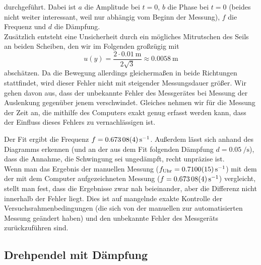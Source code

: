 \documentclass[
	a4paper,
	12pt,
	pagesize,
	ngerman
]{scrartcl}
\begin{document}
	durchgeführt. Dabei ist $a$ die Amplitude bei $t=0$, $b$ die Phase bei $t=0$  (beides nicht weiter interessant, weil nur abhängig vom Beginn der Messung), $f$ die Frequenz und $d$ die Dämpfung.\\
	Zusätzlich entsteht eine Unsicherheit durch ein mögliches Mitrutschen des Seils an beiden Scheiben, den wir im Folgenden großzügig mit 
	\begin{equation*}
		u(y) = \frac{2 \cdot \SI{0,01}{\meter}}{2 \sqrt{3}} \approx \SI{0,0058}{\meter}
	\end{equation*}
	abschätzen. Da die Bewegung allerdings gleichermaßen in beide Richtungen stattfindet, wird dieser Fehler nicht mit steigender Messungsdauer größer.
	Wir gehen davon aus, dass der unbekannte Fehler des Messgerätes bei Messung der Auslenkung gegenüber jenem verschwindet. Gleiches nehmen wir für die Messung der Zeit an, die mithilfe des Computers exakt genug erfasst werden kann, dass der Einfluss dieses Fehlers zu vernachlässigen ist. \par
	Der Fit ergibt die Frequenz $ f = \SI{0,67308 \pm 0,00004}{\per \second} $.
	Außerdem lässt sich anhand des Diagramms erkennen (und an der aus dem Fit folgenden Dämpfung $ d= \SI{0,05}{\per \second} $), dass die Annahme, die Schwingung sei ungedämpft, recht unpräzise ist. \\
	Wenn man das Ergebnis der manuellen Messung ($f_\text{Uhr} = \SI{0,71 \pm 0,0015}{\per \second}$) mit dem der mit dem Computer aufgezeichneten Messung ($ f = \SI{0,67308 \pm 0,00004}{\per \second} $) vergleicht, stellt man fest, dass die Ergebnisse zwar nah beieinander, aber die Differenz nicht innerhalb der Fehler liegt.
	Dies ist auf mangelnde exakte Kontrolle der Versuchsrahmenbedingungen (die sich von der manuellen zur automatisierten Messung geändert haben) und den unbekannte Fehler des Messgeräts zurückzuführen sind.
	
	\subsection{Drehpendel mit Dämpfung}
	
\end{document}
